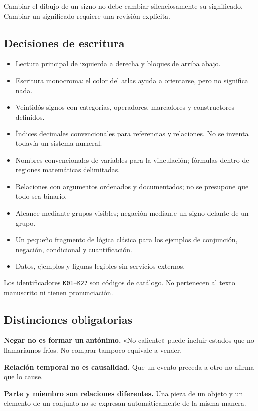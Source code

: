Cambiar el dibujo de un signo no debe cambiar silenciosamente su significado. Cambiar un significado requiere una revisión explícita.

\subsection{Decisiones de escritura}

\begin{itemize}
\item Lectura principal de izquierda a derecha y bloques de arriba abajo.
\item Escritura monocroma: el color del atlas ayuda a orientarse, pero no significa nada.
\item Veintidós signos con categorías, operadores, marcadores y constructores definidos.
\item Índices decimales convencionales para referencias y relaciones. No se inventa todavía un sistema numeral.
\item Nombres convencionales de variables para la vinculación; fórmulas dentro de regiones matemáticas delimitadas.
\item Relaciones con argumentos ordenados y documentados; no se presupone que todo sea binario.
\item Alcance mediante grupos visibles; negación mediante un signo delante de un grupo.
\item Un pequeño fragmento de lógica clásica para los ejemplos de conjunción, negación, condicional y cuantificación.
\item Datos, ejemplos y figuras legibles sin servicios externos.
\end{itemize}

Los identificadores \texttt{K01}–\texttt{K22} son códigos de catálogo. No pertenecen al texto manuscrito ni tienen pronunciación.

\subsection{Distinciones obligatorias}

\textbf{Negar no es formar un antónimo.} «No caliente» puede incluir estados que no llamaríamos fríos. No comprar tampoco equivale a vender.

\textbf{Relación temporal no es causalidad.} Que un evento preceda a otro no afirma que lo cause.

\textbf{Parte y miembro son relaciones diferentes.} Una pieza de un objeto y un elemento de un conjunto no se expresan automáticamente de la misma manera.

